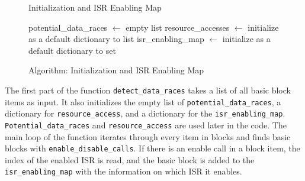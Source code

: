 \documentclass[
fancyheadings, %
%
%
]{stsreprt}
\begin{document}
{		
		\begin{figure}[H]
			\centering
			\begin{algorithm}[H]
				\caption{Initialization and ISR Enabling Map}
				\DontPrintSemicolon
				\SetAlgoLined
				\BlankLine
				potential\_data\_races $\gets$ empty list\;
				resource\_accesses $\gets$ initialize as a default dictionary to list\;
				isr\_enabling\_map $\gets$ initialize as a default dictionary to set\;
				\BlankLine
			\end{algorithm}
			\caption{Algorithm: Initialization and ISR Enabling Map}
		\end{figure}
		\vspace{1cm}
		
		
		The first part of the function \texttt{detect\_data\_races} takes a list of all basic block items as input. It also initializes the empty list of \texttt{potential\_data\_races}, a dictionary for \texttt{resource\_access}, and a dictionary for the \texttt{isr\_enabling\_map}. \texttt{Potential\_data\_races} and \texttt{resource\_access} are used later in the code. The main loop of the function iterates through every item in blocks and finds basic blocks with \texttt{enable\_disable\_calls}. If there is an enable call in a block item, the index of the enabled \ac{ISR} is read, and the basic block is added to the \texttt{isr\_enabling\_map} with the information on which \ac{ISR} it enables.
		
}
\end{document}
